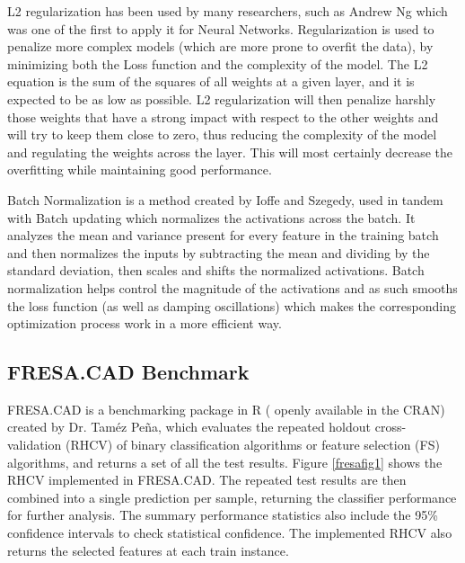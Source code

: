 L2 regularization has been used by many researchers, such as Andrew Ng which was one of the first to apply it for Neural Networks\cite{Ng:2004:FSL:1015330.1015435}. Regularization is used to penalize more complex models (which are more prone to overfit the data), by minimizing both the Loss function and the complexity of the model. The L2 equation is the sum of the squares of all weights at a given layer, and it is expected to be as low as possible. L2 regularization will then penalize harshly those weights that have a strong impact with respect to the other weights and will try to keep them close to zero, thus reducing the complexity of the model and regulating the weights across the layer. This will most certainly decrease the overfitting while maintaining good performance.

Batch Normalization is a method created by Ioffe and Szegedy\cite{Ioffe2015BatchNA}, used in tandem with Batch updating which normalizes the activations across the batch. It analyzes the mean and variance present for every feature in the training batch and then normalizes the inputs by subtracting the mean and dividing by the standard deviation, then scales and shifts the normalized activations. Batch normalization helps control the magnitude of the activations and as such smooths the loss function (as well as damping oscillations) which makes the corresponding optimization process work in a more efficient way. 


\subsection{FRESA.CAD Benchmark}
\label{fresaCAD}
FRESA.CAD is a benchmarking package in R ( openly available in the CRAN) created by Dr. Taméz Peña\cite{fresa}, which evaluates the repeated holdout cross-validation (RHCV) of binary classification algorithms or feature selection (FS) algorithms, and returns a set of all the test results. Figure \ref{fresafig1} shows the RHCV implemented in FRESA.CAD. The repeated test results are then combined into a single prediction per sample, returning the classifier performance for further analysis. The summary performance statistics also include the 95\% confidence intervals to check statistical confidence. The implemented RHCV also returns the selected features at each train instance. 

